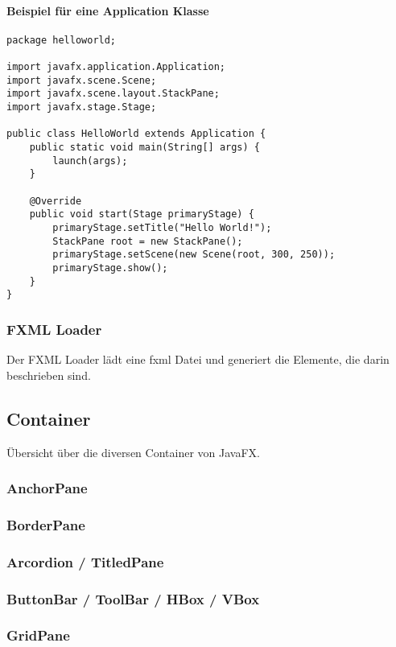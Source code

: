 \paragraph{Beispiel für eine Application Klasse}
 
\begin{lstlisting}
package helloworld;

import javafx.application.Application;
import javafx.scene.Scene;
import javafx.scene.layout.StackPane;
import javafx.stage.Stage;

public class HelloWorld extends Application {
    public static void main(String[] args) {
        launch(args);
    }

    @Override
    public void start(Stage primaryStage) {
        primaryStage.setTitle("Hello World!");
        StackPane root = new StackPane();
        primaryStage.setScene(new Scene(root, 300, 250));
        primaryStage.show();
    }
}
\end{lstlisting}

\subsubsection{FXML Loader}
Der FXML Loader lädt eine fxml Datei und generiert die Elemente, die darin beschrieben sind.


\subsection{Container}
Übersicht über die diversen Container von JavaFX.

\subsubsection{AnchorPane}

\subsubsection{BorderPane}

\subsubsection{Arcordion / TitledPane}

\subsubsection{ButtonBar / ToolBar / HBox / VBox}

\subsubsection{GridPane}

